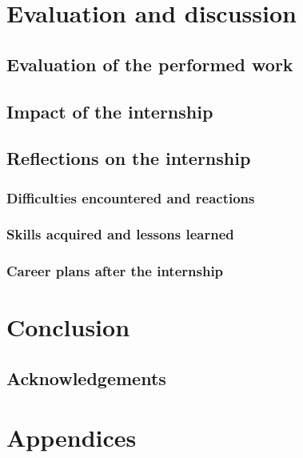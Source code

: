\documentclass[11pt,a4paper]{report}
\begin{document}
\label{sec:sec2}

\chapter{Evaluation and discussion}

\section{Evaluation of the performed work}

\section{Impact of the internship}

\section{Reflections on the internship}

\subsection{Difficulties encountered and reactions}

\subsection{Skills acquired and lessons learned}

\subsection{Career plans after the internship}

\chapter{Conclusion}

\section{Acknowledgements}

\printbibliography[title={References}]

\chapter*{Appendices}

\renewcommand\thesection{Appendix \Alph{section} -}
\setcounter{section}{0}
\end{document}
